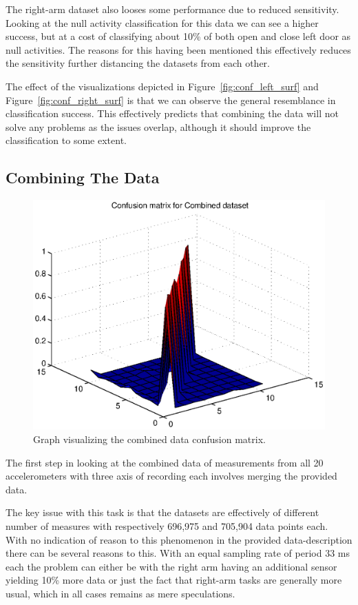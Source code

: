 \documentclass{sig-alternate}
\begin{document}
The right-arm dataset also looses some performance due to reduced sensitivity. Looking at the null activity classification for this data we can see a higher success, but at a cost of classifying about 10\% of both open and close left door as null activities. The reasons for this having been mentioned this effectively reduces the sensitivity further distancing the datasets from each other.

The effect of the visualizations depicted in Figure~\ref{fig:conf_left_surf} and Figure~\ref{fig:conf_right_surf} is that we can observe the general resemblance in classification success. This effectively predicts that combining the data will not solve any problems as the issues overlap, although it should improve the classification to some extent.

\subsection{Combining The Data}

\begin{figure}[bp]
  \centering
  \includegraphics[scale=0.4]{./matlab_output/nConfkNN_both.eps}
  \caption{Graph visualizing the combined data confusion matrix.}
  \label{fig:conf_both_surf}
\end{figure}

The first step in looking at the combined data of measurements from all 20 accelerometers with three axis of recording each involves merging the provided data.

The key issue with this task is that the datasets are effectively of different number of measures with respectively 696,975 and 705,904 data points each. With no indication of reason to this phenomenon in the provided data-description there can be several reasons to this. With an equal sampling rate of period 33 ms each the problem can either be with the right arm having an additional sensor yielding 10\% more data or just the fact that right-arm tasks are generally more usual, which in all cases remains as mere speculations.
\end{document}
